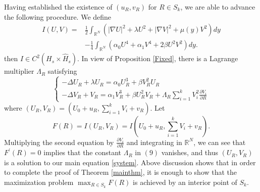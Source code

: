 \documentclass{amsart}
\theoremstyle{definition}
\theoremstyle{remark}
\numberwithin{equation}{section}
\begin{document}
Having established the existence of $(u_R, v_R)$ for $R \in S_k$, we are able to advance the following procedure. We define
\begin{equation}
\begin{aligned}\label{energy}
I(U, V)=& \frac{1}{2} \int_{\mathbb{R}^{N}}\left(|\nabla U|^{2}+\lambda U^{2}+|\nabla V|^{2}+\mu(y) V^{2}\right) d y \\
&-\frac{1}{4} \int_{\mathbb{R}^{N}}\left(\alpha_0 U^{4}+\alpha_1 V^{4}+2 \beta U^{2} V^{2}\right) d y.
\end{aligned}
\end{equation}
then $I \in C^{2}\left(H_s \times \hat{H}_s\right)$. In view of Proposition \ref{Fixed}, there is a Lagrange multiplier $\Lambda_{R}$ satisfying
\begin{equation*} 
\left\{\begin{array}{l}
-\Delta U_{R}+\lambda U_{R}=\alpha_0 U_{R}^{3}+\beta V_{R}^{2} U_{R} \\
-\Delta V_{R}+V_{R}=\alpha_1 V_{R}^{3}+\beta U_{R}^{2} V_{R}+\Lambda_{R} \sum_{i=1}^{k} V_{i}^{2} \frac{\partial V_{i}}{\partial R}
\end{array}\right.
\end{equation*}
where $\left(U_{R}, V_{R}\right)=\left(U_{0}+u_{R}, \sum_{i=1}^{k} V_{i}+v_{R}\right)$. Let
\begin{equation}\label{def_F}
F(R)=I(U_R,V_R)=I\left(U_{0}+u_{R}, \sum_{i=1}^{k} V_{i}+v_{R}\right).\end{equation} Multiplying the second equation by $\frac{\partial V_{i}}{\partial R}$
and integrating in $\mathbb{R}^{N}$, we can see that $F^{\prime}(R)=0$ implies that the constant $\Lambda_{R}$ in $(9)$ vanishes, and thus $\left(U_{R}, V_{R}\right)$ is a solution to our main equation \eqref{system}. Above discussion shows that in order to complete the proof of Theorem \ref{mainthm}, it is enough to show that the maximization problem $\max _{R \in S_{k}} F(R)$ is achieved by an interior point of $S_{k}$.  
\end{document}
